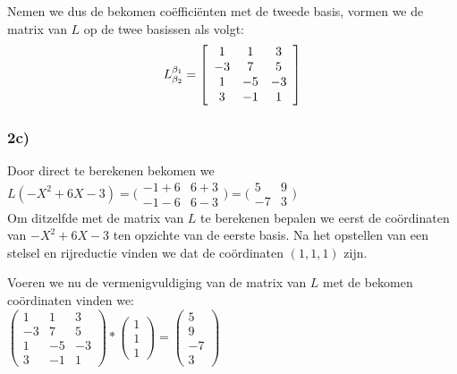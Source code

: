 \documentclass[lineaire_algebra_oplossingen.tex]{subfiles}
\begin{document}
Nemen we dus de bekomen co\"effici\"enten met de tweede basis, vormen we de matrix van $L$ op de twee basissen als volgt:\\

\[
L^{\beta_1}_{\beta_2} =
\left[
\begin{array}{c c c}
1 & 1 & 3\\
-3 & 7 & 5\\
1 & -5 & -3\\
3 & -1 & 1
\end{array}
\right]
\]

\subsubsection*{2c)}

Door direct te berekenen bekomen we\\

$ L(-X^2+6X-3) = \bigl(
\begin{smallmatrix}
-1+6&6+3\\ -1-6&6-3
\end{smallmatrix}\bigr) = \bigl(
\begin{smallmatrix}
5&9\\ -7&3
\end{smallmatrix}\bigr)$\\

Om ditzelfde met de matrix van $L$ te berekenen bepalen we eerst de co\"ordinaten van $-X^2+6X-3$ ten opzichte van de eerste basis.
Na het opstellen van een stelsel en rijreductie vinden we dat de co\"ordinaten $(1,1,1)$ zijn.

Voeren we nu de vermenigvuldiging van de matrix van $L$ met de bekomen co\"ordinaten vinden we:\\

$\begin{pmatrix}
1 & 1 & 3\\
-3 & 7 & 5\\
1 & -5 & -3\\
3 & -1 & 1
\end{pmatrix} * \begin{pmatrix}
1\\
1\\
1
\end{pmatrix} = \begin{pmatrix}
5\\
9\\
-7\\
3
\end{pmatrix}$\\
\end{document}
